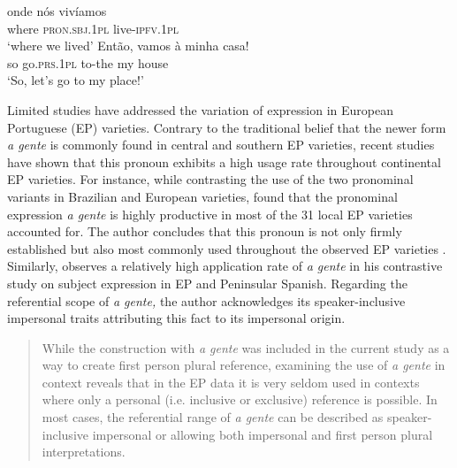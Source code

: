 \documentclass[output=paper]{langscibook}
\begin{document}
\ea\label{ex:henriques:8}
 \gll onde nós vivíamos\\
         where \textsc{pron.sbj.1pl} live-\textsc{ipfv.1pl}\\
 \glt `where we lived'
\ex\label{ex:henriques:9}
  \gll Então, vamos à minha casa!\\
         so go.\textsc{prs.1pl} to-the my house\\
 \glt `So, let's go to my place!'
 \z 

Limited studies have addressed the variation of  expression in European Portuguese (EP) varieties. Contrary to the traditional belief that the newer form \textit{a gente} is commonly found in central and southern EP varieties, recent studies have shown that this pronoun exhibits a high usage rate throughout continental EP varieties. For instance, while contrasting the use of the two  pronominal variants in Brazilian and European varieties, \citet{Sória2013} found that the pronominal expression \textit{a gente} is highly productive in most of the 31 local EP varieties accounted for. The author concludes that this pronoun is not only firmly established but also most commonly used throughout the observed EP varieties \citep{Sória2013}. Similarly, \citet{Posio2012} observes a relatively high application rate of \textit{a gente} in his contrastive study on  subject expression in EP and Peninsular Spanish. Regarding the referential scope of \textit{a gente,} the author acknowledges its speaker-inclusive impersonal traits attributing this fact to its impersonal origin.


\begin{quote}
While the construction with \textit{a gente} was included in the current study as a way to create first person plural reference, examining the use of \textit{a gente} in context reveals that in the EP data it is very seldom used in contexts where only a personal (i.e. inclusive or exclusive) reference is possible. In most cases, the referential range of \textit{a gente} can be described as speaker-inclusive impersonal or allowing both impersonal and first person plural interpretations. \citep[348]{Posio2012}    
\end{quote}
\end{document}
